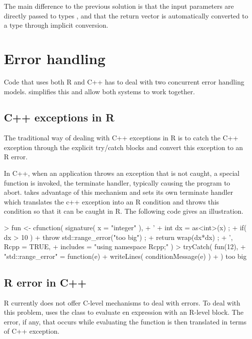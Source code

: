 
The main difference to the previous solution is that the input parameters are
directly passed to types , and that the return
vector is automatically converted to a  type through implicit
conversion.

\section{Error handling}

Code that uses both R and C++ has to deal with two concurrent
error handling models.  simplifies this and allow both 
systems to work together.

\subsection{C++ exceptions in R}

The traditional way of dealing with C++ exceptions in R is to
catch the C++ exception through the explicit try/catch blocks and
convert this exception to an R error. 

In C++, when an application throws an exception that is not caught, 
a special function is invoked, the terminate handler, typically causing 
the program to abort.  takes advantage of this mechanism
and sets its own terminate handler which translates the c++
exception into an R condition and throws this condition so that it can 
be caught in R. The following code gives an illustration. 

\begin{example}
> fun <- cfunction( signature( x = "integer" ), 
+ ' 
+   int dx = as<int>(x) ;
+   if( dx > 10 ) 
+      throw std::range_error("too big") ;
+   return wrap(dx*dx) ;
+ ', Rcpp = TRUE, 
+  includes = "using namespace Rcpp;" )
> tryCatch( fun(12), 
+ "std::range_error" = function(e){
+    writeLines( conditionMessage(e) )
+ } )
too big
\end{example}

\subsection{R error in C++}

R currently does not offer C-level mechanisms to deal with errors. To 
deal with this problem,  uses the 
class to evaluate en expression with an R-level 
block. The error, if any, that occurs while evaluating the 
function is then translated in terms of C++ exception. 

